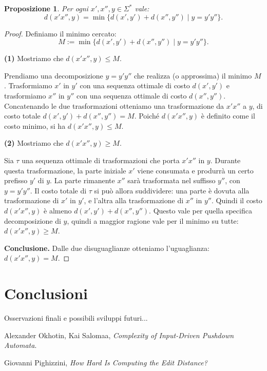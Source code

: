 \documentclass[a4paper,12pt]{report}
\newtheorem{proposizione}{Proposizione}[chapter]
\begin{document}
    \begin{proposizione}
        Per ogni $x', x'', y \in \Sigma^*$ vale:
        \[
            d(x'x'', y) = \min\{d(x', y') + d(x'', y'') \mid y = y'y''\}.
        \]
    \end{proposizione}

    \begin{proof}
        Definiamo il minimo cercato:
        \[
            M := \min\{d(x', y') + d(x'', y'') \mid y = y'y''\}.
        \]
        
        \textbf{(1)} Mostriamo che $d(x'x'', y) \leq M$.
        
        Prendiamo una decomposizione $y = y'y''$ che realizza (o approssima) il minimo $M$. Trasformiamo $x'$ in $y'$ con una sequenza ottimale di costo $d(x', y')$ e trasformiamo $x''$ in $y''$ con una sequenza ottimale di costo $d(x'', y'')$.
        Concatenando le due trasformazioni otteniamo una trasformazione da $x'x''$ a $y$, di costo totale $d(x', y') + d(x'', y'') = M$.
        Poiché $d(x'x'', y)$ è definito come il costo minimo, si ha $d(x'x'', y) \leq M$.
        
        \textbf{(2)} Mostriamo che $d(x'x'', y) \geq M$.
        
        Sia $\tau$ una sequenza ottimale di trasformazioni che porta $x'x''$ in $y$. Durante questa trasformazione, la parte iniziale $x'$ viene consumata e produrrà un certo prefisso $y'$ di $y$. La parte rimanente $x''$ sarà trasformata nel suffisso $y''$, con $y = y'y''$.
        Il costo totale di $\tau$ si può allora suddividere: una parte è dovuta alla trasformazione di $x'$ in $y'$, e l'altra alla trasformazione di $x''$ in $y''$.
        Quindi il costo $d(x'x'', y)$ è almeno $d(x', y') + d(x'', y'')$. Questo vale per quella specifica decomposizione di $y$, quindi a maggior ragione vale per il minimo su tutte: $d(x'x'', y) \geq M$.
        
        \textbf{Conclusione.} Dalle due disuguaglianze otteniamo l'uguaglianza: $d(x'x'', y) = M$.
    \end{proof}

    \section{Conclusioni}

    Osservazioni finali e possibili sviluppi futuri...

    \clearpage
    \begin{thebibliography}{9}

        Alexander Okhotin, Kai Salomaa,
        \textit{Complexity of Input-Driven Pushdown Automata}.

        Giovanni Pighizzini,
        \textit{How Hard Is Computing the Edit Distance?}


    \end{thebibliography}
\end{document}
